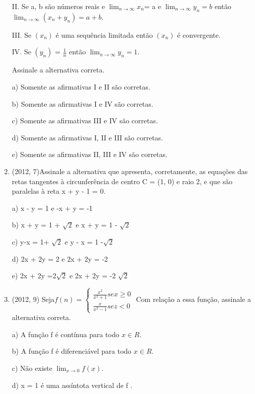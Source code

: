 \documentclass{article}
\begin{document}
\begin{enumerate}
II. Se a, b são números reais e $\lim_{n \rightarrow \infty}x_n $= a e $\lim_{n \rightarrow \infty} y_n = b$ então $\lim_{n \rightarrow \infty} (x_n + y_n ) = a + b.$

III. Se $(x_n)$ é uma sequência limitada então $(x_n)$ é convergente.

IV. Se $(y_n)$ = $\frac{1}{n}$ então $\lim_{n \rightarrow \infty} y_n = 1.$

Assinale a alternativa correta.

a) Somente as afirmativas I e II são corretas.

b) Somente as afirmativas I e IV são corretas.

c) Somente as afirmativas III e IV são corretas.

d) Somente as afirmativas I, II e III são corretas.

e) Somente as afirmativas II, III e IV são corretas.\newline




\item(2012, 7)Assinale a alternativa que apresenta, corretamente, as equações das retas tangentes à circunferência de centro C = (1, 0) e raio 2, e que são paralelas à reta x + y - 1 = 0.

a) x - y = 1 e -x + y = -1

b) x + y = 1 + $\sqrt{2}$ e x + y = 1 - $\sqrt{2}$

c) y-x = 1+ $\sqrt{2}$ e y - x = 1 -$\sqrt{2}$

d) 2x + 2y = 2 e 2x + 2y = -2

e) 2x + 2y =2$\sqrt{2}$ e 2x + 2y = -2 $\sqrt{2}$







\item(2012, 9) Seja$
f(n) = \left\{ \begin{matrix} 
 \frac{x^2}{x^2 + 1} se x \geq 0 \\
 \frac{x}{x^2 -1} se z <0
\end{matrix} \right.$
Com relação a essa função, assinale a alternativa correta.

a) A função f é contínua para todo $x \in R$.

b) A função f é diferenciável para todo $x \in R$.

c) Não existe $\lim_{x \rightarrow 0} f (x)$.

d) x = 1 é uma assíntota vertical de f .


\end{enumerate}
\end{document}
